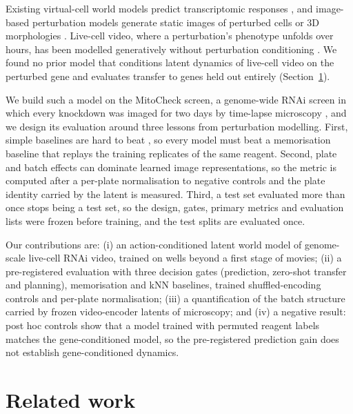 Existing virtual-cell world models predict transcriptomic responses
\citep{qiu2026chreode,miao2026vclmu,chuai2026alphacell}, and image-based perturbation models
generate static images of perturbed cells \citep{palma2025impa,wang2025morphdiff,
zhang2025cellflux,zhang2026cellfluxv2} or 3D morphologies \citep{naidoo2025form}. Live-cell
video, where a perturbation's phenotype unfolds over hours, has been modelled generatively
without perturbation conditioning \citep{holmberg2025videodiffusion}. We found no prior model
that conditions latent dynamics of live-cell video on the perturbed gene and evaluates transfer
to genes held out entirely (Section~\ref{sec:related}).

We build such a model on the MitoCheck screen, a genome-wide RNAi screen in which every
knockdown was imaged for two days by time-lapse microscopy \citep{neumann2010mitocheck}, and we
design its evaluation around three lessons from perturbation modelling. First, simple baselines
are hard to beat \citep{ahlmanneltze2025baselines}, so every model must beat a
memorisation baseline that replays the training replicates of the same reagent. Second, plate
and batch effects can dominate learned image representations, so the metric is computed after a
per-plate normalisation to negative controls and the plate identity carried by the latent is
measured. Third, a test set evaluated more than once stops being a test set, so the design,
gates, primary metrics and evaluation lists were frozen before training, and the test splits are
evaluated once.

Our contributions are: (i) an action-conditioned latent world model of genome-scale live-cell
RNAi video, trained on \NWellsStageTwoEmbedded{} wells beyond a first stage of
\NMoviesStageOne{} movies; (ii) a pre-registered evaluation with three decision gates
(prediction, zero-shot transfer and planning), memorisation and kNN baselines, trained
shuffled-encoding controls and per-plate normalisation; (iii) a quantification of the batch
structure carried by frozen video-encoder latents of microscopy; and (iv)
a negative result: post hoc controls show that a model trained
with permuted reagent labels matches the gene-conditioned model, so the pre-registered
prediction gain does not establish gene-conditioned dynamics.

\section{Related work}\label{sec:related}

